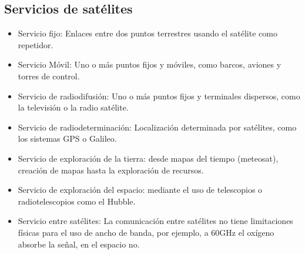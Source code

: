 	\subsection{Servicios de satélites}
	\label{sub:serviciosSat}
		\begin{itemize}
			\item Servicio fijo: Enlaces entre dos puntos terrestres usando el satélite como repetidor.
			\item Servicio Móvil: Uno o más puntos fijos y móviles, como barcos, aviones y torres de control.
			\item Servicio de radiodifusión: Uno o más puntos fijos y terminales dispersos, como la televisión o la radio satélite.
			\item Servicio de radiodeterminación: Localización determinada por satélites, como los sistemas \acrshort{GPS} o Galileo.
			\item Servicio de exploración de la tierra: desde mapas del tiempo (meteosat), creación de mapas hasta la exploración de recursos.
			\item Servicio de exploración del espacio: mediante el uso de telescopios o radiotelescopios como el Hubble.
			\item Servicio entre satélites: La comunicación entre satélites no tiene limitaciones físicas para el uso de ancho de banda, por ejemplo, a 60GHz el oxígeno absorbe la señal, en el espacio no.
		\end{itemize}
